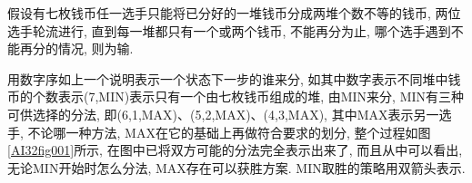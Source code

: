 \begin{example}
    假设有七枚钱币任一选手只能将已分好的一堆钱币分成两堆个数不等的钱币, 两位选手轮流进行, 直到每一堆都只有一个或两个钱币, 不能再分为止, 哪个选手遇到不能再分的情况, 则为输.
\end{example}

\begin{answer}
用数字序如上一个说明表示一个状态下一步的谁来分, 如其中数字表示不同堆中钱币的个数表示(7,MIN)表示只有一个由七枚钱币组成的堆, 由MIN来分,
MIN有三种可供选择的分法, 即(6,1,MAX)、(5,2,MAX)、(4,3,MAX), 其中MAX表示另一选手, 不论哪一种方法, MAX在它的基础上再做符合要求的划分,
整个过程如图\ref{AI32fig001}所示, 在图中已将双方可能的分法完全表示出来了, 而且从中可以看出, 无论MIN开始时怎么分法, MAX存在可以获胜方案.
MIN取胜的策略用双箭头表示.
\end{answer}
